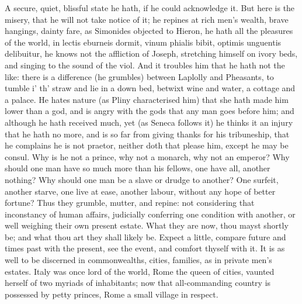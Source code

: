 {A secure, quiet, blissful state he hath, if he could acknowledge it.
But here is the misery, that he will not take notice of it; he repines
at rich men's wealth, brave hangings, dainty fare, as Simonides
objected to Hieron, he hath all the pleasures of the world, in
lectis eburneis dormit, vinum phialis bibit, optimis unguentis
delibuitur, he knows not the affliction of Joseph, stretching himself
on ivory beds, and singing to the sound of the viol. And it troubles
him that he hath not the like: there is a difference (he grumbles)
between Laplolly and Pheasants, to tumble i' th' straw and lie in a
down bed, betwixt wine and water, a cottage and a palace. He hates
nature (as Pliny characterised him) that she hath made him lower
than a god, and is angry with the gods that any man goes before him;
and although he hath received much, yet (as Seneca follows it) he
thinks it an injury that he hath no more, and is so far from giving
thanks for his tribuneship, that he complains he is not praetor,
neither doth that please him, except he may be consul. Why is he not a
prince, why not a monarch, why not an emperor? Why should one man have
so much more than his fellows, one have all, another nothing? Why
should one man be a slave or drudge to another? One surfeit, another
starve, one live at ease, another labour, without any hope of better
fortune? Thus they grumble, mutter, and repine: not considering that
inconstancy of human affairs, judicially conferring one condition with
another, or well weighing their own present estate. What they are now,
thou mayst shortly be; and what thou art they shall likely be. Expect a
little, compare future and times past with the present, see the event,
and comfort thyself with it. It is as well to be discerned in
commonwealths, cities, families, as in private men's estates. Italy was
once lord of the world, Rome the queen of cities, vaunted herself of
two myriads of inhabitants; now that all-commanding country is
possessed by petty princes, Rome a small village in respect.

}
